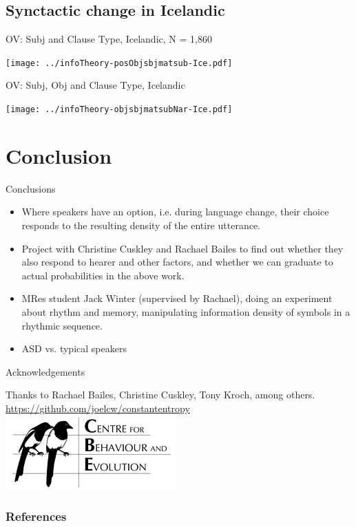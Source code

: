 \documentclass[hyperref={pdfpagelabels=false}]{beamer}
\begin{document}
\subsection{Synctactic change in Icelandic}
\begin{frame}{OV: Subj and Clause Type, Icelandic, N = 1,860} 



\texttt{[image: ../infoTheory-posObjsbjmatsub-Ice.pdf]}

\end{frame}

\begin{frame}{OV: Subj, Obj and Clause Type, Icelandic}

\nocite{icepahc09}
	
	\texttt{[image: ../infoTheory-objsbjmatsubNar-Ice.pdf]}
	

\end{frame}






\section{Conclusion}

\begin{frame}{Conclusions}
		\begin{itemize}
			\item Where speakers have an option, i.e. during language change, their choice responds to the resulting density of the entire utterance.
			\item Project with Christine Cuskley and Rachael Bailes to find out whether they also respond to hearer and other factors, and whether we can graduate to actual probabilities in the above work.
			\item MRes student Jack Winter (supervised by Rachael), doing an experiment about rhythm and memory, manipulating information density of symbols in a rhythmic sequence.
			\item ASD vs. typical speakers 
		\end{itemize}
\end{frame}





\begin{frame}{Acknowledgements}
\begin{center}

Thanks to Rachael Bailes, Christine Cuskley, Tony Kroch, among others.
\url{https://github.com/joelcw/constantentropy}\\\vspace{3mm}
\includegraphics[scale = 0.4]{CBElogo.jpg} 
\end{center}
\end{frame}


\begin{frame}[allowframebreaks]
\frametitle{References}
\newcommand*{\newblock}{natbib}


\end{frame}
\end{document}
